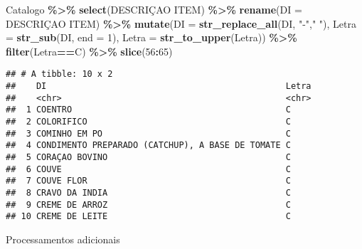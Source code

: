 \documentclass[
]{article}
\newenvironment{Shaded}{\begin{snugshade}}{\end{snugshade}}
\newcommand{\DataTypeTok}[1]{\textcolor[rgb]{0.13,0.29,0.53}{#1}}
\newcommand{\DecValTok}[1]{\textcolor[rgb]{0.00,0.00,0.81}{#1}}
\newcommand{\KeywordTok}[1]{\textcolor[rgb]{0.13,0.29,0.53}{\textbf{#1}}}
\newcommand{\NormalTok}[1]{#1}
\newcommand{\OperatorTok}[1]{\textcolor[rgb]{0.81,0.36,0.00}{\textbf{#1}}}
\newcommand{\StringTok}[1]{\textcolor[rgb]{0.31,0.60,0.02}{#1}}
\begin{document}
\begin{Shaded}
\begin{Highlighting}[]
\NormalTok{Catalogo }\OperatorTok{\%\textgreater{}\%}\StringTok{ }\KeywordTok{select}\NormalTok{(}\StringTok{\textasciigrave{}}\DataTypeTok{DESCRIÇAO ITEM}\StringTok{\textasciigrave{}}\NormalTok{) }\OperatorTok{\%\textgreater{}\%}\StringTok{  }\KeywordTok{rename}\NormalTok{(}\DataTypeTok{DI =} \StringTok{\textasciigrave{}}\DataTypeTok{DESCRIÇAO ITEM}\StringTok{\textasciigrave{}}\NormalTok{) }\OperatorTok{\%\textgreater{}\%}
\StringTok{ }\KeywordTok{mutate}\NormalTok{(}\DataTypeTok{DI =} \KeywordTok{str\_replace\_all}\NormalTok{(DI, }\StringTok{"{-}"}\NormalTok{,}\StringTok{" "}\NormalTok{),}
\DataTypeTok{Letra =} \KeywordTok{str\_sub}\NormalTok{(DI, }\DataTypeTok{end =} \DecValTok{1}\NormalTok{),}
\DataTypeTok{Letra =} \KeywordTok{str\_to\_upper}\NormalTok{(Letra)) }\OperatorTok{\%\textgreater{}\%}\StringTok{ }\KeywordTok{filter}\NormalTok{(Letra}\OperatorTok{==}\StringTok{\textquotesingle{}C\textquotesingle{}}\NormalTok{) }\OperatorTok{\%\textgreater{}\%}
\KeywordTok{slice}\NormalTok{(}\DecValTok{56}\OperatorTok{:}\DecValTok{65}\NormalTok{) }
\end{Highlighting}
\end{Shaded}

\begin{verbatim}
## # A tibble: 10 x 2
##    DI                                               Letra
##    <chr>                                            <chr>
##  1 COENTRO                                          C    
##  2 COLORIFICO                                       C    
##  3 COMINHO EM PO                                    C    
##  4 CONDIMENTO PREPARADO (CATCHUP), A BASE DE TOMATE C    
##  5 CORAÇAO BOVINO                                   C    
##  6 COUVE                                            C    
##  7 COUVE FLOR                                       C    
##  8 CRAVO DA INDIA                                   C    
##  9 CREME DE ARROZ                                   C    
## 10 CREME DE LEITE                                   C
\end{verbatim}

Processamentos adicionais
\end{document}
